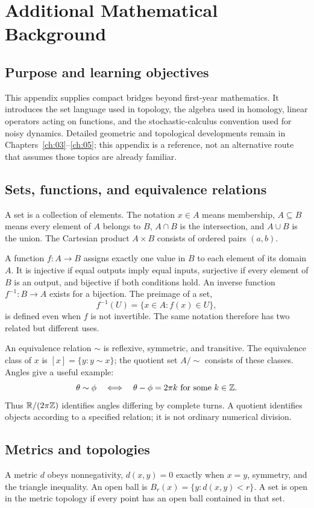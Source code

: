 \chapter{Additional Mathematical Background}\label{app:d}

\section*{Purpose and learning objectives}
This appendix supplies compact bridges beyond first-year mathematics. It introduces the set language used in topology, the algebra used in homology, linear operators acting on functions, and the stochastic-calculus convention used for noisy dynamics. Detailed geometric and topological developments remain in Chapters~\ref{ch:03}--\ref{ch:05}; this appendix is a reference, not an alternative route that assumes those topics are already familiar.

\section{Sets, functions, and equivalence relations}
A set is a collection of elements. The notation \(x\in A\) means membership, \(A\subseteq B\) means every element of \(A\) belongs to \(B\), \(A\cap B\) is the intersection, and \(A\cup B\) is the union. The Cartesian product \(A\times B\) consists of ordered pairs \((a,b)\).

A function \(f:A\to B\) assigns exactly one value in \(B\) to each element of its domain \(A\). It is injective if equal outputs imply equal inputs, surjective if every element of \(B\) is an output, and bijective if both conditions hold. An inverse function \(f^{-1}:B\to A\) exists for a bijection. The preimage of a set,
\[
f^{-1}(U)=\{x\in A:f(x)\in U\},
\]
is defined even when \(f\) is not invertible. The same notation therefore has two related but different uses.

An equivalence relation \(\sim\) is reflexive, symmetric, and transitive. The equivalence class of \(x\) is \([x]=\{y:y\sim x\}\); the quotient set \(A/{\sim}\) consists of these classes. Angles give a useful example:
\[
\theta\sim\phi\quad\Longleftrightarrow\quad
\theta-\phi=2\pi k\text{ for some }k\in\mathbb{Z}.
\]
Thus \(\mathbb{R}/(2\pi\mathbb{Z})\) identifies angles differing by complete turns. A quotient identifies objects according to a specified relation; it is not ordinary numerical division.

\section{Metrics and topologies}
A metric \(d\) obeys nonnegativity, \(d(x,y)=0\) exactly when \(x=y\), symmetry, and the triangle inequality. An open ball is \(B_r(x)=\{y:d(x,y)<r\}\). A set is open in the metric topology if every point has an open ball contained in that set.

